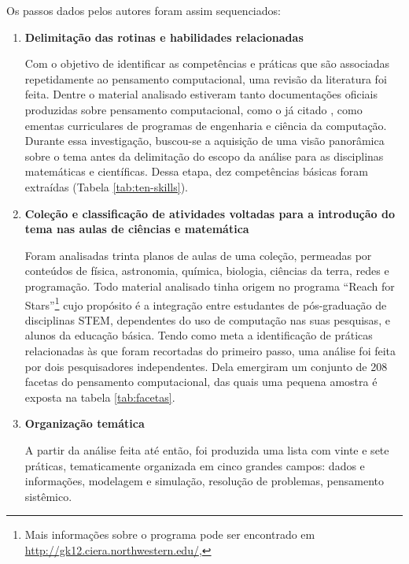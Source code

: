 Os passos dados pelos autores foram assim sequenciados:

\begin{enumerate}
  \item \textbf{Delimitação das rotinas e habilidades relacionadas}

  Com o objetivo de identificar as competências e práticas que são associadas repetidamente ao pensamento computacional, uma revisão da literatura foi feita. Dentre o material analisado estiveram tanto documentações oficiais produzidas sobre pensamento computacional, como o já citado , como ementas curriculares de programas de engenharia e ciência da computação. Durante essa investigação, buscou-se a aquisição de uma visão panorâmica sobre o tema antes da delimitação do escopo da análise para as disciplinas matemáticas e científicas. Dessa etapa, dez competências básicas foram extraídas (Tabela \ref{tab:ten-skills}).

  

  \item \textbf{Coleção e classificação de atividades voltadas para a introdução do tema nas aulas de ciências e matemática} 
  
  Foram analisadas trinta planos de aulas de uma coleção, permeadas por conteúdos de física, astronomia, química, biologia, ciências da terra, redes e programação. Todo material analisado tinha origem no programa ``Reach for Stars''\footnote{Mais informações sobre o programa pode ser encontrado em \href{http://gk12.ciera.northwestern.edu/}{http://gk12.ciera.northwestern.edu/}, } cujo propósito é a integração entre estudantes de pós-graduação de disciplinas STEM, dependentes do uso de computação nas suas pesquisas, e alunos da educação básica. Tendo como meta a identificação de práticas relacionadas às que foram recortadas do primeiro passo, uma análise foi feita por dois pesquisadores independentes. Dela emergiram um conjunto de 208 facetas do pensamento computacional, das quais uma pequena amostra é exposta na tabela \ref{tab:facetas}.
  
  

  \item \textbf{Organização temática} 
  
  A partir da análise feita até então, foi produzida uma lista com vinte e sete práticas, tematicamente organizada em cinco grandes campos: dados e informações, modelagem e simulação, resolução de problemas, pensamento sistêmico.


\end{enumerate}
